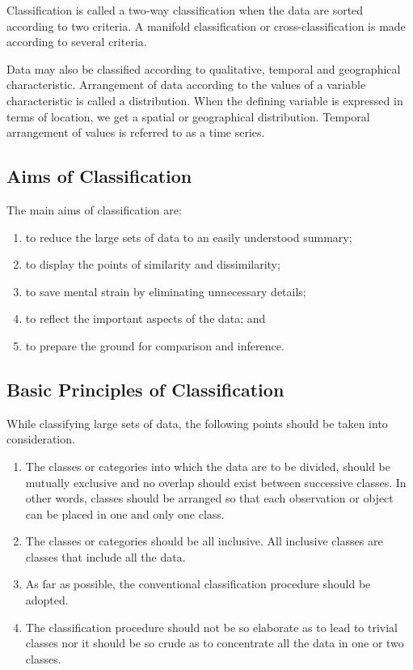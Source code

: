 \documentclass[]{article}
\providecommand{\tightlist}{%
  \setlength{\itemsep}{0pt}\setlength{\parskip}{0pt}}
\begin{document}
Classification is called a two-way classification when the data are
sorted according to two criteria. A manifold classification or
cross-classification is made according to several criteria.

Data may also be classified according to qualitative, temporal and
geographical characteristic. Arrangement of data according to the values
of a variable characteristic is called a distribution. When the defining
variable is expressed in terms of location, we get a spatial or
geographical distribution. Temporal arrangement of values is referred to
as a time series.

\hypertarget{aims-of-classification}{%
\subsection{Aims of Classification}\label{aims-of-classification}}

The main aims of classification are:

\begin{enumerate}
\def\labelenumi{\arabic{enumi}.}
\tightlist
\item
  to reduce the large sets of data to an easily understood summary;
\item
  to display the points of similarity and dissimilarity;
\item
  to save mental strain by eliminating unnecessary details;
\item
  to reflect the important aspects of the data; and
\item
  to prepare the ground for comparison and inference.
\end{enumerate}

\hypertarget{basic-principles-of-classification}{%
\subsection{Basic Principles of
Classification}\label{basic-principles-of-classification}}

While classifying large sets of data, the following points should be
taken into consideration.

\begin{enumerate}
\def\labelenumi{\arabic{enumi}.}
\tightlist
\item
  The classes or categories into which the data are to be divided,
  should be mutually exclusive and no overlap should exist between
  successive classes. In other words, classes should be arranged so that
  each observation or object can be placed in one and only one class.
\item
  The classes or categories should be all inclusive. All inclusive
  classes are classes that include all the data.
\item
  As far as possible, the conventional classification procedure should
  be adopted.
\item
  The classification procedure should not be so elaborate as to lead to
  trivial classes nor it should be so crude as to concentrate all the
  data in one or two classes.
\end{enumerate}
\end{document}
